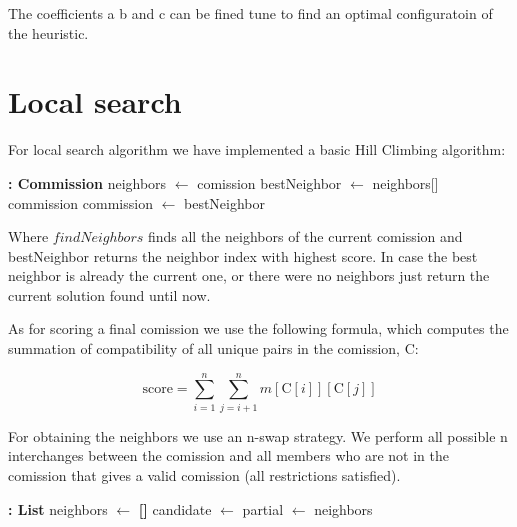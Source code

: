 \documentclass{article}
\begin{document}
The coefficients a b and c can be fined tune to find an optimal configuratoin of the heuristic.

\newpage
\section{Local search}

For local search algorithm we have implemented a basic Hill Climbing algorithm: 

\begin{algorithm}[H]
\begin{algorithmic}[1]
 \textbf{: Commission}
        \State neighbors $\gets$ 
          \State \Return comission
        \EndIf
        \State bestNeighbor $\gets$ neighbors[]
            \State \Return commission
        \EndIf
        \State commission $\gets$ bestNeighbor
    \EndWhile
\EndFunction
\end{algorithmic}
\end{algorithm}

Where $findNeighbors$ finds all the neighbors of the current comission and bestNeighbor returns the neighbor index with highest score. In case the best neighbor is already the current one, or there were no neighbors just return the current solution found until now.

As for scoring a final comission we use the following formula, which computes the summation of compatibility of all unique pairs in the comission, C:

\[
\text{score} = \sum_{i=1}^{n} \sum_{j=i+1}^{n} m[\text{C}[i]][\text{C}[j]]
\]

For obtaining the neighbors we use an n-swap strategy. We perform all possible n interchanges between the comission and all members who are not in the comission that gives a valid comission (all restrictions satisfied).

\begin{algorithm}[H]
\begin{algorithmic}[1]
 \textbf{: List}
    \State neighbors $\gets$ \textbf{[]}
            \State candidate $\gets$ 
                \State {}
                \State partial $\gets$ 
                \State {}
            \EndIf
        \EndFor
    \EndFor
    \State \Return neighbors
\EndFunction
\end{algorithmic}
\end{algorithm}
\end{document}
